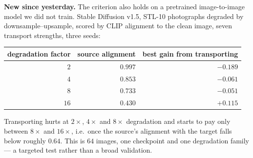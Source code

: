 \documentclass[11pt]{article}
\begin{document}
\textbf{New since yesterday.} The criterion also holds on a pretrained image-to-image model we
did not train. Stable Diffusion v1.5, STL-10 photographs degraded by downsample--upsample,
scored by CLIP alignment to the clean image, seven transport strengths, three seeds:

\begin{center}
\small
\begin{tabular}{@{}rrr@{}}
\toprule
degradation factor & source alignment & best gain from transporting\\
\midrule
$2$  & $0.997$ & $-0.189$\\
$4$  & $0.853$ & $-0.061$\\
$8$  & $0.733$ & $-0.051$\\
$16$ & $0.430$ & $+0.115$\\
\bottomrule
\end{tabular}
\end{center}

Transporting hurts at $2\times$, $4\times$ and $8\times$ degradation and starts to pay only
between $8\times$ and $16\times$, i.e.\ once the source's alignment with the target falls below
roughly $0.64$. This is $64$ images, one checkpoint and one degradation family --- a targeted
test rather than a broad validation.
\end{document}
